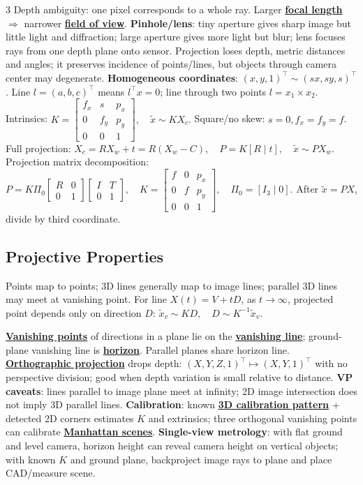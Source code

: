 \documentclass{article}
\numberwithin{equation}{subsection}
\newcommand{\key}[1]{\textbf{#1}}
\newcommand{\lowterm}[1]{\textbf{\underline{#1}}}
\begin{document}
\begin{multicols*}{3}
Depth ambiguity: one pixel corresponds to a whole ray. Larger \lowterm{focal length} $\Rightarrow$ narrower \lowterm{field of view}.
\key{Pinhole/lens}: tiny aperture gives sharp image but little light and diffraction; large aperture gives more light but blur; lens focuses rays from one depth plane onto sensor. Projection loses depth, metric distances and angles; it preserves incidence of points/lines, but objects through camera center may degenerate.
\key{Homogeneous coordinates}: $(x,y,1)^\top\sim(sx,sy,s)^\top$. Line $l=(a,b,c)^\top$ means $l^\top x=0$; line through two points $l=x_1\times x_2$. Intrinsics:
\(
K=\begin{bmatrix}f_x&s&p_x\\0&f_y&p_y\\0&0&1\end{bmatrix},\quad
\tilde x\sim KX_c .
\)
Square/no skew: $s=0,f_x=f_y=f$. Full projection:
\(
X_c=RX_w+t=R(X_w-C),\quad P=K[R\mid t],\quad \tilde x\sim PX_w .
\)
Projection matrix decomposition:
\(
P=K\Pi_0
\begin{bmatrix}R&0\\0&1\end{bmatrix}
\begin{bmatrix}I&T\\0&1\end{bmatrix},\quad
K=\begin{bmatrix}f&0&p_x\\0&f&p_y\\0&0&1\end{bmatrix},\quad
\Pi_0=[I_3\mid0].
\)
After $\tilde x=PX$, divide by third coordinate.

\subsection{Projective Properties}
Points map to points; 3D lines generally map to image lines; parallel 3D lines may meet at vanishing point. For line $X(t)=V+tD$, as $t\to\infty$, projected point depends only on direction $D$:
\(
\tilde x_v\sim KD,\quad D\sim K^{-1}\tilde x_v .
\)

\lowterm{Vanishing points} of directions in a plane lie on the \lowterm{vanishing line}; ground-plane vanishing line is \lowterm{horizon}. Parallel planes share horizon line. \lowterm{Orthographic projection} drops depth:
\(
(X,Y,Z,1)^\top\mapsto(X,Y,1)^\top
\)
with no perspective division; good when depth variation is small relative to distance.
\key{VP caveats}: lines parallel to image plane meet at infinity; 2D image intersection does not imply 3D parallel lines. \key{Calibration}: known \lowterm{3D calibration pattern} + detected 2D corners estimates $K$ and extrinsics; three orthogonal vanishing points can calibrate \lowterm{Manhattan scenes}. \key{Single-view metrology}: with flat ground and level camera, horizon height can reveal camera height on vertical objects; with known $K$ and ground plane, backproject image rays to plane and place CAD/measure scene.


\end{multicols*}
\end{document}
